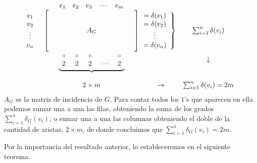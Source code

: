 \[
\begin{array}{cccc}
& 
\begin{array}{ccccccccccc}
e_1&e_2&e_3&\cdots&e_m
\end{array}
\\
\begin{array}{c}
v_1\\
v_2\\
\vdots\\
v_n
\end{array}
&
\left[
\begin{array}{cccccccccccccccccc}
& & & & & & & & & &  \\
\\
& & & & & A_G\\
\\
\\
\end{array}
\right]
&
\left.
\hspace*{-1em}
\begin{array}{c}
=\delta(v_1)\\
=\delta(v_2)\\
\vdots\\
=\delta(v_n)\\
\end{array}
\right\}
&
\sum_{i=1}^{n}\delta(v_i)
\\
&
\underbrace{
\begin{array}{ccccccccccc}
\shortparallel\hspace*{0.4em}&\shortparallel\hspace*{0.4em}&\shortparallel\hspace*{0.4em}&&\shortparallel\\
2\hspace*{0.4em}&2\hspace*{0.4em}&2\hspace*{0.4em}&\cdots&2
\end{array}
}
&
&
\downarrow
\\
\\
& 
2\times m
&
\rightarrow
&
\sum_{i=1}^{n}\delta(v_i)=2m
\end{array}
\]
$A_G$ es la matriz de incidencia de $G$. 
Para contar todos los $1$'s que aparecen en ella podemos sumar una a una las filas, obteniendo la suma de los grados $\sum_{i=1}^{n}\delta_G(v_i)$, o sumar una a una las columnas obteniendo el doble de la cantidad de aristas, $2\times m$, de donde concluimos que $\sum_{i=1}^{n}\delta_G(v_i)=2m$.

Por la importancia del resultado anterior, lo estableceremos en el siguiente teorema.

